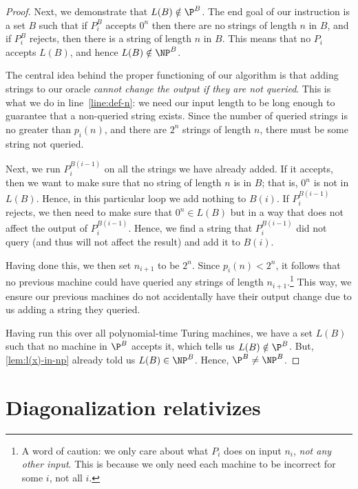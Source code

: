 \documentclass[english,12pt]{reedthesis}
\theoremstyle{plain}
\theoremstyle{definition}
\theoremstyle{remark}
\begin{document}
\begin{proof}
  Next, we demonstrate that $L(B) \notin \P^{B}$. The end goal of our instruction is
  a set $B$ such that if $P_{i}^{B}$ accepts $0^{n}$ then there are no strings
  of length $n$ in $B$, and if $P_{i}^{B}$ rejects, then there is a string of
  length $n$ in $B$. This means that no $P_{i}$ accepts $L(B)$, and hence
  $L(B) \notin \NP^{B}$.

  The central idea behind the proper functioning of our algorithm is that adding
  strings to our oracle \emph{cannot change the output if they are not queried}.
  This is what we do in line~\ref{line:def-n}: we need our input length to be
  long enough to guarantee that a non-queried string exists. Since the number of
  queried strings is no greater than $p_{i}(n)$, and there are $2^{n}$ strings
  of length $n$, there must be some string not queried.

  Next, we run $P_{i}^{B(i-1)}$ on all the strings we have already added. If it
  accepts, then we want to make sure that no string of length $n$ is in $B$;
  that is, $0^{n}$ is not in $L(B)$. Hence, in this particular loop we add
  nothing to $B(i)$. If $P_{i}^{B(i-1)}$ rejects, we then need to make sure that
  $0^{n} \in L(B)$ but in a way that does not affect the output of
  $P_{i}^{B(i-1)}$. Hence, we find a string that $P_{i}^{B(i-1)}$ did not query
  (and thus will not affect the result) and add it to $B(i)$.

  Having done this, we then set $n_{i+1}$ to be $2^{n}$. Since
  $p_{i}(n) < 2^{n}$, it follows that no previous machine could have queried any
  strings of length $n_{i+1}$.\footnote{A word of caution: we only care about
    what $P_{i}$ does on input $n_{i}$, \emph{not any other input}. This is
    because we only need each machine to be incorrect for some $i$, not all
    $i$.} This way, we ensure our previous machines do not accidentally have
  their output change due to us adding a string they queried.

  Having run this over all polynomial-time Turing machines, we have a set $L(B)$
  such that no machine in $\P^{B}$ accepts it, which tells us $L(B) \notin \P^{B}$.
  But, \cref{lem:l(x)-in-np} already told us $L(B) \in \NP^{B}$. Hence,
  $\P^{B} \ne \NP^{B}$.
\end{proof}

\section{Diagonalization relativizes}\label{sec:diag-relativizes}
\end{document}

